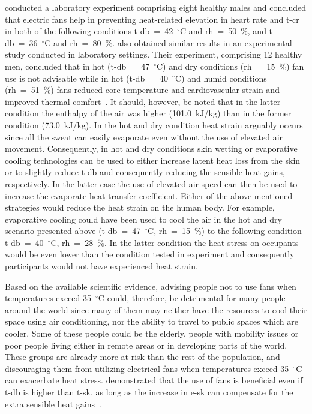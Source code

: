  conducted a laboratory experiment comprising eight healthy males and concluded that electric fans help in preventing heat-related elevation in heart rate and \ac{t-cr} in both of the following conditions \ac{t-db}~=~42~$^{\circ}$C and \ac{rh}~=~50~\%, and \ac{t-db}~=~36~$^{\circ}$C and \ac{rh}~=~80~\%.
 also obtained similar results in an experimental study conducted in laboratory settings.
Their experiment, comprising 12 healthy men, concluded that in hot (\ac{t-db}~=~47~$^{\circ}$C) and dry conditions (\ac{rh}~=~15~\%) fan use is not advisable while in hot (\ac{t-db}~=~40~$^{\circ}$C) and humid conditions (\ac{rh}~=~51~\%) fans reduced core temperature and cardiovascular strain and improved thermal comfort~\cite{Morris2019}.
It should, however, be noted that in the latter condition the enthalpy of the air was higher (101.0~kJ/kg) than in the former condition (73.0~kJ/kg).
In the hot and dry condition heat strain arguably occurs since all the sweat can easily evaporate even without the use of elevated air movement.
Consequently, in hot and dry conditions skin wetting or evaporative cooling technologies can be used to either increase latent heat loss from the skin or to slightly reduce \ac{t-db} and consequently reducing the sensible heat gains, respectively.
In the latter case the use of elevated air speed can then be used to increase the evaporate heat transfer coefficient.
Either of the above mentioned strategies would reduce the heat strain on the human body.
For example, evaporative cooling could have been used to cool the air in the hot and dry scenario presented above (\ac{t-db}~=~47~$^{\circ}$C, \ac{rh}~=~15~\%) to the following condition \ac{t-db}~=~40~$^{\circ}$C, \ac{rh}~=~28~\%\@.
In the latter condition the heat stress on occupants would be even lower than the condition tested in  experiment and consequently participants would not have experienced heat strain.

Based on the available scientific evidence, advising people not to use fans when temperatures exceed 35~$^{\circ}$C could, therefore, be detrimental for many people around the world since many of them may neither have the resources to cool their space using air conditioning, nor the ability to travel to public spaces which are cooler.
Some of these people could be the elderly, people with mobility issues or poor people living either in remote areas or in developing parts of the world.
These groups are already more at risk than the rest of the population, and discouraging them from utilizing electrical fans when temperatures exceed 35~$^{\circ}$C can exacerbate heat stress.
 demonstrated that the use of fans is beneficial even if \ac{t-db} is higher than \ac{t-sk}, as long as the increase in \ac{e-sk} can compensate for the extra sensible heat gains~\cite{Jay2015}.

